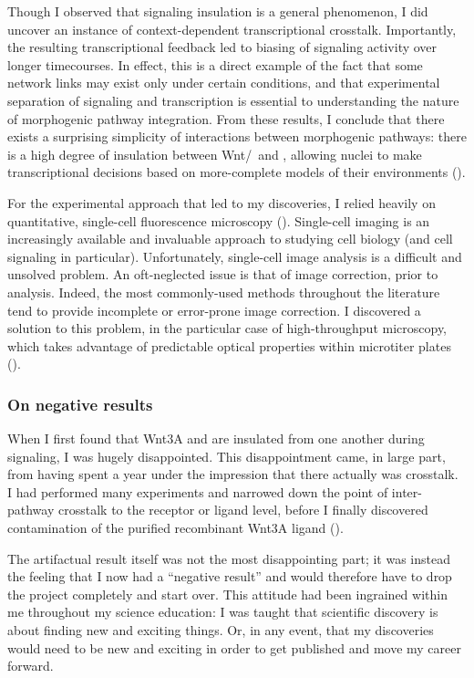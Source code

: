 Though I observed that signaling insulation is a general
phenomenon, I did uncover an instance of context-dependent
transcriptional crosstalk. Importantly, the resulting transcriptional
feedback led to biasing of signaling
activity over longer timecourses. In effect, this is a direct
example of the fact that some network links may exist only under certain
conditions, and that experimental separation of signaling and transcription is essential
to understanding the nature of morphogenic pathway integration.
From these results, I conclude that there exists a surprising simplicity
of interactions between morphogenic pathways: there is a high degree
of insulation between Wnt/\bcat\ and \tgfbsf, allowing nuclei to make
transcriptional decisions based on more-complete models of their environments
().


For the experimental approach that led to my discoveries,
I relied heavily on quantitative, single-cell fluorescence
microscopy ().
Single-cell imaging is an increasingly available
and invaluable approach
to studying cell biology (and cell signaling in particular).
Unfortunately, single-cell image analysis is a difficult and unsolved problem.
An oft-neglected issue is that of image correction, prior to
analysis. Indeed, the most commonly-used methods throughout the literature
tend to provide incomplete or error-prone image correction.
I discovered a solution to this problem, in the particular case
of high-throughput microscopy, which takes advantage of predictable optical
properties within microtiter plates ().


\subsubsection{On negative results}


When I first found that Wnt3A and  are insulated
from one another during signaling, I was hugely disappointed. This disappointment
came, in large part, from having spent a year under the impression
that there actually was crosstalk. I had performed many experiments
and narrowed down the point of inter-pathway crosstalk to the receptor
or ligand level, before I finally discovered contamination of the purified
recombinant Wnt3A ligand ().


The artifactual result itself was not the most disappointing part;
it was instead the feeling that I now had a ``negative result'' and would
therefore have to drop the project completely and start over.
This attitude had been ingrained within me throughout my science
education: I was taught that scientific discovery is about finding
new and exciting things. Or, in any event, that my discoveries would need to be
new and exciting in order to get published and move my career forward.


